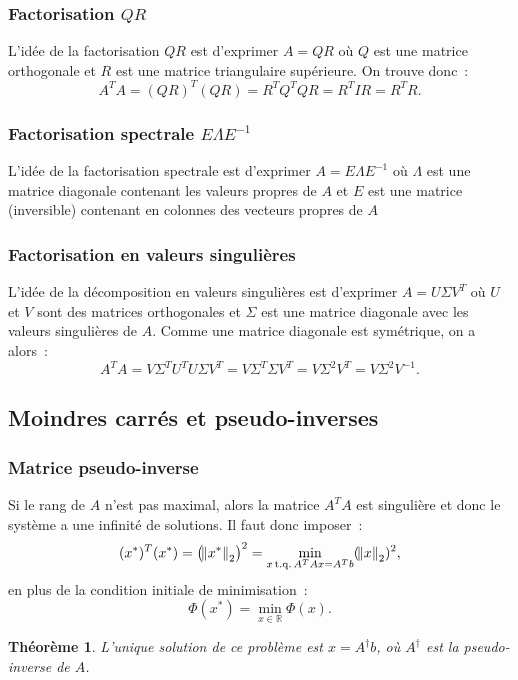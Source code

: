 \documentclass{article}
\newtheorem{thm}{Théorème}[section]
\theoremstyle{definition}
\theoremstyle{remark}
\DeclareMathOperator{\tq}{t.q.}  %
\newcommand{\R}{\mathbb R}
\begin{document}
		\subsubsection{Factorisation $QR$}
		L'idée de la factorisation $QR$ est d'exprimer $A = QR$ où $Q$ est une matrice orthogonale et $R$ est une matrice triangulaire supérieure. On trouve donc~:
		\[A^TA = (QR)^T(QR) = R^TQ^TQR = R^TIR = R^TR.\]

		\subsubsection{Factorisation spectrale $E\Lambda E^{-1}$}
		L'idée de la factorisation spectrale est d'exprimer $A = E\Lambda E^{-1}$ où $\Lambda$ est une matrice diagonale contenant les valeurs propres de $A$
		et $E$ est une matrice (inversible) contenant en colonnes des vecteurs propres de $A$

		\subsubsection{Factorisation en valeurs singulières}
		L'idée de la décomposition en valeurs singulières est d'exprimer $A = U\Sigma V^T$ où $U$ et $V$ sont des matrices orthogonales et $\Sigma$ est une
		matrice diagonale avec les valeurs singulières de $A$. Comme une matrice diagonale est symétrique, on a alors~:
		\[A^TA = V\Sigma^T U^TU\Sigma V^T = V\Sigma^T \Sigma V^T = V\Sigma^2V^T = V\Sigma^2V^{-1}.\]

	\subsection{Moindres carrés et pseudo-inverses}
		\subsubsection{Matrice pseudo-inverse}
		Si le rang de $A$ n'est pas maximal, alors la matrice $A^TA$ est singulière et donc le système a une infinité de solutions. Il faut donc imposer~:
		\[(x^*)^T(x^*) = \left(\norm {x^*}_2\right)^2 = \min_{x \tq A^TAx = A^Tb}(\norm x_2)^2,\]
		en plus de la condition initiale de minimisation~:
		\[\Phi(x^*) = \min_{x \in \R}\Phi(x).\]

		\begin{thm} L'unique solution de ce problème est $x = A^\dagger b$, où $A^\dagger$ est la \emph{pseudo-inverse} de $A$.
		\end{thm}
\end{document}
